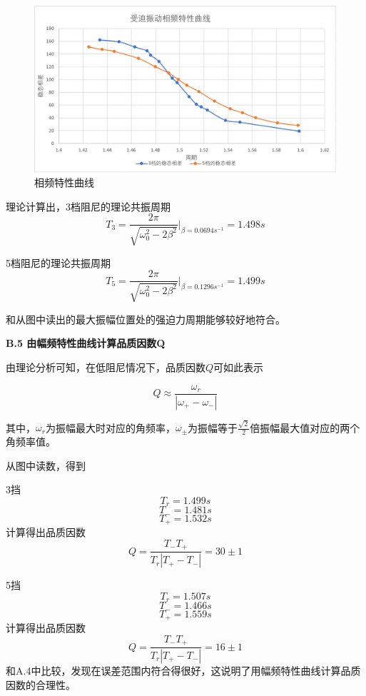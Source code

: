 \documentclass[a4paper,11pt]{article}
\begin{document}
        \begin{figure}[ht]
            \centering
            \includegraphics[scale=0.5]{相频特性曲线.png}
            \caption{相频特性曲线}
            \label{fig: 相频特性曲线}
        \end{figure}

        理论计算出，3档阻尼的理论共振周期
        $$
            T_3 = \frac{2\pi}{\sqrt{\omega_0^2-2\beta^2}}\Bigg|_{\beta = 0.0694s^{-1}} =  1.498s
        $$

        5档阻尼的理论共振周期
        $$
            T_5 = \frac{2\pi}{\sqrt{\omega_0^2-2\beta^2}}\Bigg|_{\beta = 0.1296s^{-1}} =  1.499s
        $$

        和从图中读出的最大振幅位置处的强迫力周期能够较好地符合。

        \textbf{B.5 由幅频特性曲线计算品质因数Q}

        由理论分析可知，在低阻尼情况下，品质因数$Q$可如此表示

        \begin{equation}
            Q \approx \frac{\omega_r}{|\omega_+-\omega_-|}
        \end{equation}

        其中，$\omega_r$为振幅最大时对应的角频率，$\omega_\pm$为振幅等于$\frac{\sqrt{2}}2$倍振幅最大值对应的两个角频率值。

        从图中读数，得到

        3挡
        $$
            T_r = 1.499s
        $$
        $$
            T_- = 1.481s
        $$
        $$
            T_+ = 1.532s
        $$
        计算得出品质因数
        $$
            Q = \frac{T_-T_+}{T_r|T_+-T_-|} = 30 \pm 1
        $$
        
        5挡
        $$
            T_r = 1.507s
        $$
        $$
            T_- = 1.466s
        $$
        $$
            T_+ = 1.559s
        $$
        计算得出品质因数
        $$
            Q = \frac{T_-T_+}{T_r|T_+-T_-|} = 16 \pm 1
        $$
        和A.4中比较，发现在误差范围内符合得很好，这说明了用幅频特性曲线计算品质因数的合理性。
\end{document}
